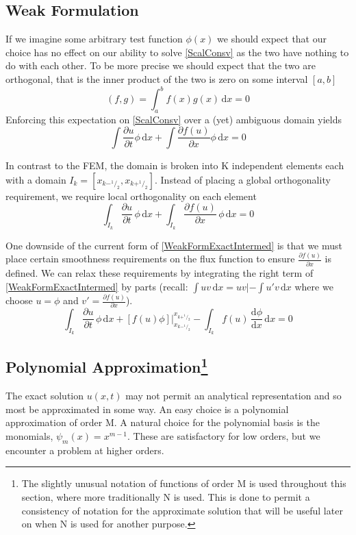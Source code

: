 \documentclass[letterpaper]{article}
\begin{document}
\subsection{Weak Formulation}
If we imagine some arbitrary test function $\phi(x)$ we should expect that our choice has no effect on our ability to solve \eqref{ScalConsv} as the two have nothing to do with each other. To be more precise we should expect that the two are orthogonal, that is the inner product of the two is zero on some interval $[a,b]$
	\begin{equation}\label{InnerProd}
	(f,g) = \int_a^b \! f(x)g(x) \, \mathrm{d}x = 0
	\end{equation}
Enforcing this expectation on \eqref{ScalConsv} over a (yet) ambiguous domain yields
	\begin{equation}\label{WeakFormGlobal}
	\int\! \frac{\partial u}{\partial t} \phi \,\mathrm{d}x + \int\! \frac{\partial f(u)}{\partial x} \phi \,\mathrm{d}x = 0
	\end{equation}

In contrast to the FEM, the domain is broken into K independent elements each with a domain $I_k =[x_{k-^1\!/_2},x_{k+^1\!/_2}]$. Instead of placing a global orthogonality requirement, we require local orthogonality on each element
	\begin{equation}\label{WeakFormExactIntermed}
	\int_{I_k}\! \frac{\partial u}{\partial t} \,\phi \,\mathrm{d}x + \int_{I_k}\! \frac{\partial f(u)}{\partial x} \,\phi \,\mathrm{d}x = 0
	\end{equation}

One downside of the current form of \eqref{WeakFormExactIntermed} is that we must place certain smoothness requirements on the flux function to ensure $\frac{\partial f(u)}{\partial x}$ is defined. We can relax these requirements by integrating the right term of \eqref{WeakFormExactIntermed} by parts (recall: $\int uv \,\mathrm{d}x = uv| - \int u'v \,\mathrm{d}x$ where we choose $u=\phi$ and $v'=\frac{\partial f(u)}{\partial x}$).
	\begin{equation}\label{WeakFormExact}
	\int_{I_k}\! \frac{\partial u}{\partial t} \,\phi \,\mathrm{d}x +
	[f(u)\phi] \Big\rvert_{x_{k-^1\!/_2}}^{x_{k+^1\!/_2}} -
	\int_{I_k}\! f(u) \,\frac{\mathrm{d} \phi}{\mathrm{d} x} \,\mathrm{d}x = 0
	\end{equation}

\subsection[Polynomial Approximation]
{Polynomial Approximation\footnote{The slightly unusual notation of functions of order M is used throughout this section, where more traditionally N is used. This is done to permit a consistency of notation for the approximate solution that will be useful later on when N is used for another purpose.} }
The exact solution $u(x,t)$ may not permit an analytical representation and so most be approximated in some way. An easy choice is a polynomial approximation of order M. A natural choice for the polynomial basis is the monomials, $\psi_m(x) = x^{m-1}$. These are satisfactory for low orders, but we encounter a problem at higher orders.
\end{document}
